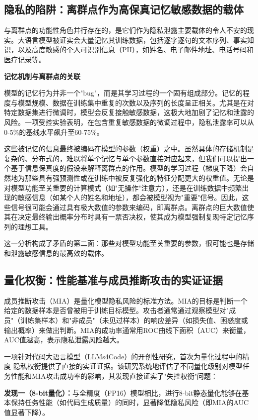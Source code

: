 \documentclass[letterpaper,twocolumn,10pt]{article}
\begin{document}
\subsection{隐私的陷阱：离群点作为高保真记忆敏感数据的载体}

与离群点的功能性角色并行存在的，是它们作为隐私泄露主要载体的令人不安的现实。大语言模型被证实会大量记忆其训练数据，包括逐字逐句的文本序列、事实知识，以及高度敏感的个人可识别信息（PII），如姓名、电子邮件地址、电话号码和医疗记录等。

\textbf{记忆机制与离群点的关联}

模型的记忆行为并非一个"bug"，而是其学习过程的一个固有组成部分。记忆的程度与模型规模、数据在训练集中重复的次数以及序列的长度呈正相关。尤其是在对特定数据集进行微调时，模型会反复接触敏感数据，这极大地加剧了记忆和泄露的风险。一项受控实验表明，在包含重复敏感数据的微调过程中，隐私泄露率可以从0-5\%的基线水平飙升至60-75\%。

这些被记忆的信息最终被编码在模型的参数（权重）之中。虽然具体的存储机制是复杂的、分布式的，难以将单个记忆与单个参数直接对应起来，但我们可以提出一个基于信息保真度的假设来解释离群点的作用。模型的学习过程（梯度下降）会自然地为那些具有强预测性或在训练中被反复强化的特征分配更大的权重值。无论是对模型功能至关重要的计算模式（如"无操作"注意力），还是在训练数据中频繁出现的敏感信息（如某个人的姓名和地址），都会被模型视为"重要"信号。因此，这些信号很可能会通过具有极大数值的参数来编码，即离群点。离群点的巨大数值使其在决定最终输出概率分布时具有一票否决权，使其成为模型强制复现特定记忆序列的理想工具。

这一分析构成了矛盾的第二面：那些对模型功能至关重要的参数，很可能也是存储和泄露敏感信息的最高效的载体。

\subsection{量化权衡：性能基准与成员推断攻击的实证证据}

成员推断攻击（MIA）是量化模型隐私风险的标准方法。MIA的目标是判断一个给定的数据样本是否曾被用于训练目标模型。攻击者通常通过观察模型对"成员"（训练集样本）和"非成员"（未见过样本）的响应差异（如损失值、困惑度或输出概率）来做出判断。MIA的成功率通常用ROC曲线下面积（AUC）来衡量，AUC值越高，表示隐私泄露风险越大。

一项针对代码大语言模型（LLMs4Code）的开创性研究，首次为量化过程中的精度-隐私权衡提供了直接的实证证据。该研究系统地评估了不同量化级别对模型任务性能和MIA攻击成功率的影响，其发现直接证实了"失控权衡"问题：

\textbf{发现一（8-bit量化）：}与全精度（FP16）模型相比，进行8-bit静态量化能够在基本保持任务性能（如代码生成质量）的同时，显著降低隐私风险（即MIA的AUC值显著下降）。
\end{document}
